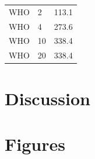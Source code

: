 \documentclass[11pt,]{article}
\begin{document}
\begin{longtable}[c]{@{}lll@{}}
\begin{minipage}[t]{0.13\columnwidth}\raggedright\strut
WHO
\strut\end{minipage} &
\begin{minipage}[t]{0.18\columnwidth}\raggedright\strut
2
\strut\end{minipage} &
\begin{minipage}[t]{0.18\columnwidth}\raggedright\strut
113.1
\strut\end{minipage}\tabularnewline
\begin{minipage}[t]{0.13\columnwidth}\raggedright\strut
WHO
\strut\end{minipage} &
\begin{minipage}[t]{0.18\columnwidth}\raggedright\strut
4
\strut\end{minipage} &
\begin{minipage}[t]{0.18\columnwidth}\raggedright\strut
273.6
\strut\end{minipage}\tabularnewline
\begin{minipage}[t]{0.13\columnwidth}\raggedright\strut
WHO
\strut\end{minipage} &
\begin{minipage}[t]{0.18\columnwidth}\raggedright\strut
10
\strut\end{minipage} &
\begin{minipage}[t]{0.18\columnwidth}\raggedright\strut
338.4
\strut\end{minipage}\tabularnewline
\begin{minipage}[t]{0.13\columnwidth}\raggedright\strut
WHO
\strut\end{minipage} &
\begin{minipage}[t]{0.18\columnwidth}\raggedright\strut
20
\strut\end{minipage} &
\begin{minipage}[t]{0.18\columnwidth}\raggedright\strut
338.4
\strut\end{minipage}\tabularnewline
\bottomrule
\end{longtable}

\section{Discussion}\label{discussion}

\section{Figures}\label{figures}
\end{document}
